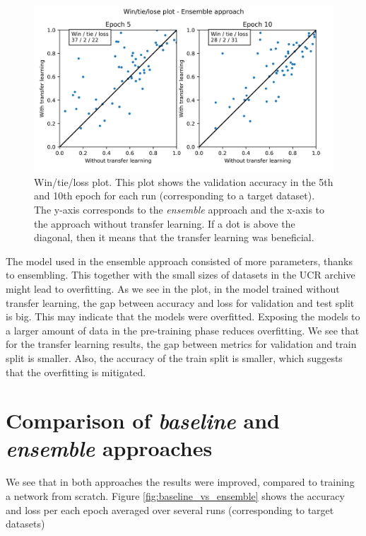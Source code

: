 \documentclass[a4paper,11pt,twoside]{report}
\theoremstyle{definition}
\begin{document}
\FloatBarrier
\begin{figure}[h!t]
\centering
\includegraphics[width=17 cm]{imgs/ensemble/win_tie_lose_epoch.png}
\caption{Win/tie/loss plot. This plot shows the validation accuracy in the 5th and 10th epoch for each run (corresponding to a target dataset). The y-axis corresponds to the \textit{ensemble} approach and the x-axis to the approach without transfer learning. If a dot is above the diagonal, then it means that the transfer learning was beneficial.}
\label{fig:win_tie_loss_ensemble}
\end{figure}
The model used in the ensemble approach consisted of more parameters, thanks to ensembling. This together with the small sizes of datasets in the UCR archive might lead to overfitting. As we see in the plot, in the model trained without transfer learning, the gap between accuracy and loss for validation and test split is big. This may indicate that the models were overfitted. Exposing the models to a larger amount of data in the pre-training phase reduces overfitting. We see that for the transfer learning results, the gap between metrics for validation and train split is smaller. Also, the accuracy of the train split is smaller, which suggests that the overfitting is mitigated.

\section{Comparison of\textit{ baseline }and\textit{ ensemble }approaches}
We see that in both approaches the results were improved, compared to training a network from scratch. Figure \ref{fig:baseline_vs_ensemble} shows the accuracy and loss per each epoch averaged over several runs (corresponding to target datasets)
\end{document}
